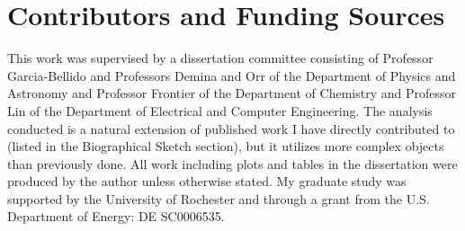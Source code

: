 \section*{Contributors and Funding Sources}

This work was supervised by a dissertation committee consisting of Professor 
Garcia-Bellido and Professors Demina and Orr of the Department of Physics and
Astronomy and Professor Frontier of the Department of Chemistry and Professor 
Lin of the Department of Electrical and Computer Engineering. The analysis conducted 
is a natural extension of published work I have directly contributed to (listed in 
the Biographical Sketch section), but it utilizes more complex objects than previously done.
All work including plots and tables in the dissertation were produced by the author 
unless otherwise stated. My graduate study was supported by the University of Rochester and through
a grant from the U.S. Department of Energy: DE SC0006535.
